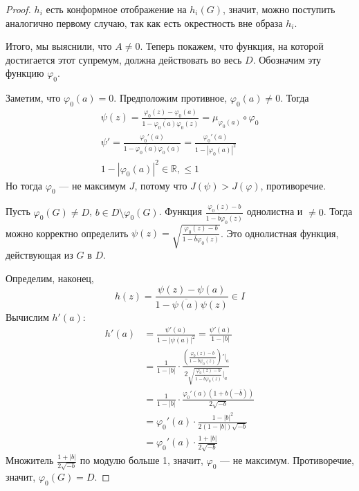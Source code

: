 \documentclass[12pt]{article}
\newcommand{\R}{\mathbb{R}}
\theoremstyle{thmnote}
\theoremstyle{remark}
\theoremstyle{defnote}
\begin{document}
\begin{proof}
    $h_i$ есть конформное отображение на $h_i(G)$, значит, можно поступить аналогично первому случаю, так как есть окрестность вне образа $h_i$.

    Итого, мы выяснили, что $A \neq 0$. Теперь покажем, что функция, на которой достигается этот супремум, должна действовать во весь $D$. Обозначим эту функцию $\varphi_0$.

    Заметим, что $\varphi_0(a) = 0$. Предположим противное, $\varphi_0(a) \neq 0$. Тогда
    \begin{gather*}
        \psi(z) = \frac{\varphi_0(z) - \varphi_0(a)}{1 - \overline{\varphi_0(a)} \varphi_0(z)} = \mu_{\varphi_0(a)} \circ \varphi_0 \\
        \psi' = \frac{\varphi_0'(a)}{1 - \overline{\varphi_0(a)} \varphi_0(a)} = \frac{\varphi_0'(a)}{1 - |\varphi_0(a)|^2} \\
        1 - |\varphi_0(a)|^2 \in \R, \leq 1
    \end{gather*}
    Но тогда $\varphi_0$ --- не максимум $J$, потому что $J(\psi) > J(\varphi)$, противоречие.

    Пусть $\varphi_0(G) \neq D$, $b \in D \setminus \varphi_0(G)$. Функция $\frac{\varphi_0(z) - b}{1 - \overline{b} \varphi_0(z)}$ однолистна и $\neq 0$. Тогда можно корректно определить $\psi(z) = \sqrt{\frac{\varphi_0(z) - b}{1 - \overline{b} \varphi_0(z)}}$. Это однолистная функция, действующая из $G$ в $D$.

    Определим, наконец,
    \begin{equation*}
        h(z) = \frac{\psi(z) - \psi(a)}{1 - \overline{\psi(a)} \psi(z)} \in I
    \end{equation*}
    Вычислим $h'(a)$:
    \begin{align*}
        h'(a) &= \frac{\psi'(a)}{1 - |\psi(a)|^2} = \frac{\psi'(a)}{1 - |b|} \\
        &= \frac{1}{1 - |b|} \cdot \frac{\left( \frac{\varphi_0(z) - b}{1 - \overline{b} \varphi_0(z)} \right)' \Big|_a}{2 \sqrt{\frac{\varphi_0(z) - b}{1 - \overline{b} \varphi_0(z)}} \Big|_a} \\
        &= \frac{1}{1 - |b|} \cdot \frac{\varphi_0'(a) (1 + b(-\overline{b}))}{2 \sqrt{-b}} \\
        &= \varphi_0'(a) \cdot \frac{1 - |b|^2}{2 (1 - |b|) \sqrt{-b}} \\
        &= \varphi_0'(a) \cdot \frac{1 + |b|}{2 \sqrt{-b}}
    \end{align*}
    Множитель $\frac{1 + |b|}{2 \sqrt{-b}}$ по модулю больше 1, значит, $\varphi_0$ --- не максимум. Противоречие, значит, $\varphi_0(G) = D$.
\end{proof}
\end{document}
